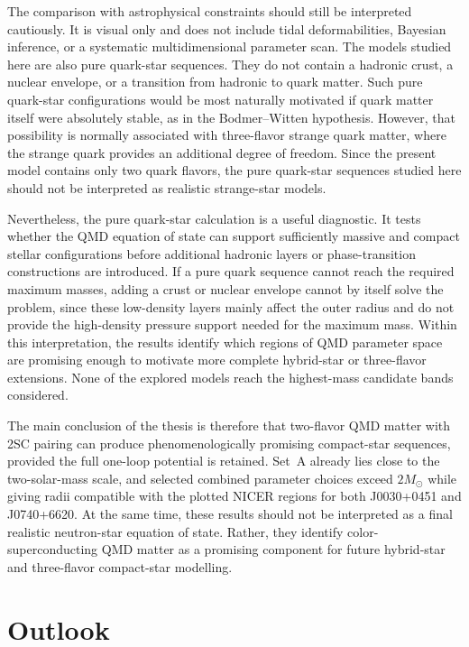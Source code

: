 The comparison with astrophysical constraints should still be interpreted
cautiously. It is visual only and does not include tidal deformabilities,
Bayesian inference, or a systematic multidimensional parameter scan. The models
studied here are also pure quark-star sequences. They do not contain a hadronic
crust, a nuclear envelope, or a transition from hadronic to quark matter. Such
pure quark-star configurations would be most naturally motivated if quark matter
itself were absolutely stable, as in the Bodmer--Witten hypothesis. However,
that possibility is normally associated with three-flavor strange quark matter,
where the strange quark provides an additional degree of freedom. Since the
present model contains only two quark flavors, the pure quark-star sequences
studied here should not be interpreted as realistic strange-star models.

Nevertheless, the pure quark-star calculation is a useful diagnostic. It tests
whether the QMD equation of state can support sufficiently massive and compact
stellar configurations before additional hadronic layers or phase-transition
constructions are introduced. If a pure quark sequence cannot reach the required
maximum masses, adding a crust or nuclear envelope cannot by itself solve the
problem, since these low-density layers mainly affect the outer radius and do
not provide the high-density pressure support needed for the maximum mass.
Within this interpretation, the results identify which regions of QMD parameter
space are promising enough to motivate more complete hybrid-star or three-flavor
extensions. None of the explored models reach the highest-mass candidate bands
considered.

The main conclusion of the thesis is therefore that two-flavor QMD matter with
2SC pairing can produce phenomenologically promising compact-star sequences,
provided the full one-loop potential is retained. Set~A already
lies close to the two-solar-mass scale, and selected combined parameter choices
exceed \(2M_\odot\) while giving radii compatible with the plotted NICER regions
for both J0030+0451 and J0740+6620. At the same time, these results should not
be interpreted as a final realistic neutron-star equation of state. Rather, they
identify color-superconducting QMD matter as a promising component for future
hybrid-star and three-flavor compact-star modelling.

\section{Outlook}

